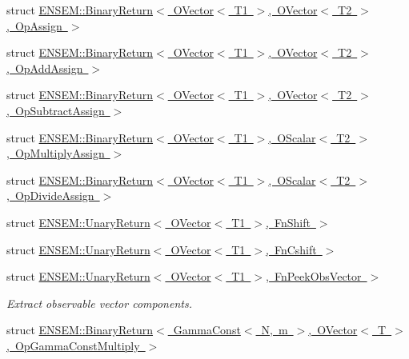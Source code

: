 \begin{DoxyCompactItemize}
\item 
struct \mbox{\hyperlink{structENSEM_1_1BinaryReturn_3_01OVector_3_01T1_01_4_00_01OVector_3_01T2_01_4_00_01OpAssign_01_4}{E\+N\+S\+E\+M\+::\+Binary\+Return$<$ O\+Vector$<$ T1 $>$, O\+Vector$<$ T2 $>$, Op\+Assign $>$}}
\item 
struct \mbox{\hyperlink{structENSEM_1_1BinaryReturn_3_01OVector_3_01T1_01_4_00_01OVector_3_01T2_01_4_00_01OpAddAssign_01_4}{E\+N\+S\+E\+M\+::\+Binary\+Return$<$ O\+Vector$<$ T1 $>$, O\+Vector$<$ T2 $>$, Op\+Add\+Assign $>$}}
\item 
struct \mbox{\hyperlink{structENSEM_1_1BinaryReturn_3_01OVector_3_01T1_01_4_00_01OVector_3_01T2_01_4_00_01OpSubtractAssign_01_4}{E\+N\+S\+E\+M\+::\+Binary\+Return$<$ O\+Vector$<$ T1 $>$, O\+Vector$<$ T2 $>$, Op\+Subtract\+Assign $>$}}
\item 
struct \mbox{\hyperlink{structENSEM_1_1BinaryReturn_3_01OVector_3_01T1_01_4_00_01OScalar_3_01T2_01_4_00_01OpMultiplyAssign_01_4}{E\+N\+S\+E\+M\+::\+Binary\+Return$<$ O\+Vector$<$ T1 $>$, O\+Scalar$<$ T2 $>$, Op\+Multiply\+Assign $>$}}
\item 
struct \mbox{\hyperlink{structENSEM_1_1BinaryReturn_3_01OVector_3_01T1_01_4_00_01OScalar_3_01T2_01_4_00_01OpDivideAssign_01_4}{E\+N\+S\+E\+M\+::\+Binary\+Return$<$ O\+Vector$<$ T1 $>$, O\+Scalar$<$ T2 $>$, Op\+Divide\+Assign $>$}}
\item 
struct \mbox{\hyperlink{structENSEM_1_1UnaryReturn_3_01OVector_3_01T1_01_4_00_01FnShift_01_4}{E\+N\+S\+E\+M\+::\+Unary\+Return$<$ O\+Vector$<$ T1 $>$, Fn\+Shift $>$}}
\item 
struct \mbox{\hyperlink{structENSEM_1_1UnaryReturn_3_01OVector_3_01T1_01_4_00_01FnCshift_01_4}{E\+N\+S\+E\+M\+::\+Unary\+Return$<$ O\+Vector$<$ T1 $>$, Fn\+Cshift $>$}}
\item 
struct \mbox{\hyperlink{structENSEM_1_1UnaryReturn_3_01OVector_3_01T1_01_4_00_01FnPeekObsVector_01_4}{E\+N\+S\+E\+M\+::\+Unary\+Return$<$ O\+Vector$<$ T1 $>$, Fn\+Peek\+Obs\+Vector $>$}}
\begin{DoxyCompactList}\small\item\em Extract observable vector components. \end{DoxyCompactList}\item 
struct \mbox{\hyperlink{structENSEM_1_1BinaryReturn_3_01GammaConst_3_01N_00_01m_01_4_00_01OVector_3_01T_01_4_00_01OpGammaConstMultiply_01_4}{E\+N\+S\+E\+M\+::\+Binary\+Return$<$ Gamma\+Const$<$ N, m $>$, O\+Vector$<$ T $>$, Op\+Gamma\+Const\+Multiply $>$}}
\item 

\end{DoxyCompactItemize}
